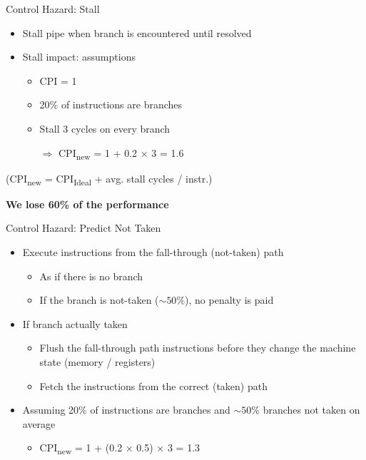 \documentclass[aspectratio=169,12pt]{beamer}
\begin{document}
\begin{frame}{Control Hazard: Stall}
    \begin{itemize}
        \item Stall pipe when branch is encountered until resolved
        \item Stall impact: assumptions
        \begin{itemize}
            \item CPI = 1
            \item 20\% of instructions are branches
            \item Stall 3 cycles on every branch
            \item[$\Rightarrow$] CPI\textsubscript{new} = 1 + 0.2 × 3 = 1.6
        \end{itemize}
    \end{itemize}
    
    \vspace{0.5cm}
    \centering
    (CPI\textsubscript{new} = CPI\textsubscript{Ideal} + avg. stall cycles / instr.)
    
    \vspace{0.5cm}
    \textbf{We lose 60\% of the performance}
\end{frame}

\begin{frame}{Control Hazard: Predict Not Taken}
    \begin{itemize}
        \item Execute instructions from the fall-through (not-taken) path
        \begin{itemize}
            \item As if there is no branch
            \item If the branch is not-taken ($\sim50\%$), no penalty is paid
        \end{itemize}
        \item If branch actually taken
        \begin{itemize}
            \item Flush the fall-through path instructions before they change the machine state (memory / registers)
            \item Fetch the instructions from the correct (taken) path
        \end{itemize}
        \item Assuming 20\% of instructions are branches and $\sim50\%$ branches not taken on average
        \begin{itemize}
            \item CPI\textsubscript{new} = 1 + (0.2 × 0.5) × 3 = 1.3
        \end{itemize}
    \end{itemize}
\end{frame}
\end{document}
